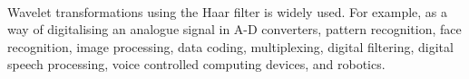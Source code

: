 \paragraph{}
Wavelet transformations using the Haar filter is widely used. For example, as a
way of digitalising an analogue signal in A-D converters, pattern recognition,
face recognition, image processing, data coding, multiplexing, digital
filtering, digital speech processing, voice controlled computing devices,
and robotics.

\begin{comment}
This chapter contains all the information needed to put the thesis into
context. It is common to use (a revised version) of your literature survey for
this purpose.
It is important to refer from your text to sources you have used, as listed in
your bibliography section (appendix). For example, “XP is a recent agile
development method [1]” is a common style of doing this, where the following
entry would be included in your bibliography:
[1] K. Beck, E. Gamma, Test infected: Programmers love writing tests, Java
Report 3 (7) (1998) 51–56.
If you want to refer to books you have read as part of the curriculum, you can
also do so in this way.
Have a look at Chapter 2 of this example thesis at Paul’s
homepage\footnote{http://homepages.cwi.nl/~paulk/thesesMasterSoftwareEngineering/2006/RichardKettelerij.pdf}.
\end{comment}